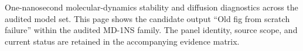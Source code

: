 One-nanosecond molecular-dynamics stability and diffusion diagnostics across the audited model set. This page shows the candidate output ``Old fig from scratch failure'' within the audited MD-1NS family. The panel identity, source scope, and current status are retained in the accompanying evidence matrix.
